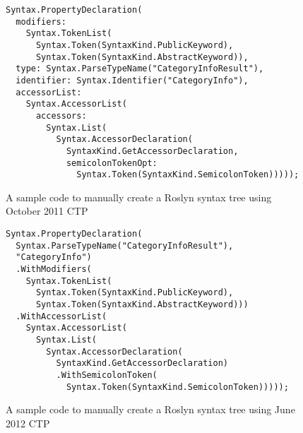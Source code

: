 \begin{figure}[p]

\begin{lstlisting}
Syntax.PropertyDeclaration(
  modifiers:
    Syntax.TokenList(
      Syntax.Token(SyntaxKind.PublicKeyword),
      Syntax.Token(SyntaxKind.AbstractKeyword)),
  type: Syntax.ParseTypeName("CategoryInfoResult"),
  identifier: Syntax.Identifier("CategoryInfo"),
  accessorList:
    Syntax.AccessorList(
      accessors:
        Syntax.List(
          Syntax.AccessorDeclaration(
            SyntaxKind.GetAccessorDeclaration,
            semicolonTokenOpt:
              Syntax.Token(SyntaxKind.SemicolonToken)))));
\end{lstlisting}

\caption{A sample code to manually create a Roslyn syntax tree using October 2011 CTP}
\label{Roslyn code 2011}
\end{figure}

\begin{figure}[p]

\begin{lstlisting}
Syntax.PropertyDeclaration(
  Syntax.ParseTypeName("CategoryInfoResult"),
  "CategoryInfo")
  .WithModifiers(
    Syntax.TokenList(
      Syntax.Token(SyntaxKind.PublicKeyword),
      Syntax.Token(SyntaxKind.AbstractKeyword)))
  .WithAccessorList(
    Syntax.AccessorList(
      Syntax.List(
        Syntax.AccessorDeclaration(
          SyntaxKind.GetAccessorDeclaration)
          .WithSemicolonToken(
            Syntax.Token(SyntaxKind.SemicolonToken)))));
\end{lstlisting}

\caption{A sample code to manually create a Roslyn syntax tree using June 2012 CTP}
\label{Roslyn code 2012}
\end{figure}